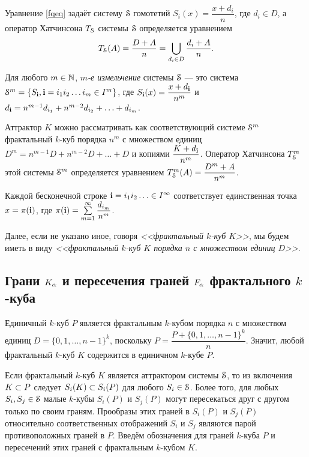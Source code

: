 Уравнение \eqref{fqeq} задаёт систему ${\EuScript S}$ гомотетий $S_i(x)=\dfrac{x+d_i}{n}$, где $d_i\in D$, а оператор Хатчинсона $T_{\EuScript S}$ системы ${\EuScript S}$ определяется уравнением $$T_{\EuScript S}(A)=\dfrac{D+A}{n}=\bigcup\limits_{d_i\in D}\dfrac{d_i+A}{n}.$$

\begin{definition}\label{refin}
Для любого $m\in \mathbb{N}$, {\em $m$-е измельчение} системы ${\EuScript S}$ --- это система ${\EuScript S}^m=\{S_{\bf{i}}, {\bf{i}}=i_1i_2\ldots i_m\in I^m\}$, где $S_{\bf{i}}(x)=\dfrac{x+d_{\bf{i}}}{n^m}$ и $d_{\bf{i}}=n^{m-1}d_{i_1}+n^{m-2}d_{i_2}+\ldots+d_{i_m}$. 
\end{definition}

Аттрактор $K$ можно рассматривать как соответствующий системе ${\EuScript S}^m$ фрактальный $k$-куб порядка $n^m$ с множеством единиц $D^m=n^{m-1}D+n^{m-2}D+\ldots+D$ и копиями $\dfrac{K+d_{\bf{i}}}{n^m}$.
Оператор Хатчинсона $T_{\EuScript S}^m$ этой системы ${\EuScript S}^m$ определяется уравнением $T_{\EuScript S}^m(A)=\dfrac{D^m+A}{n^m}$.

Каждой бесконечной строке ${\bf{i}}=i_1i_2\ldots\in I^\infty$ соответствует единственная точка $x=\pi({\bf{i}})$, где $\pi({\bf{i}})=\sum\limits_{m=1}^\infty \dfrac{d_{i_m}}{n^m}$.

\begin{remark}%
Далее, если не указано иное, говоря {\em <<фрактальный $k$-куб $K$>>}, мы будем иметь в виду {\em <<фрактальный $k$-куб $K$ порядка $n$ с множеством единиц $D$>>}. 
\end{remark}


\subsection{Грани $K_\alpha$ и пересечения граней $F_\alpha$ фрактального $k$-куба}

Единичный $k$-куб $P$ является фрактальным $k$-кубом порядка $n$ с множеством единиц $D=\{0,1,\ldots,n-1\}^k$, поскольку $P=\dfrac{P+\{0,1,\ldots,n-1\}^k}{n}.$
Значит, любой фрактальный $k$-куб $K$ содержится в единичном $k$-кубе $P$.

Если фрактальный $k$-куб $K$ является аттрактором системы ${\EuScript S}$, то из включения $K\subset P$ следует $S_i(K)\subset S_i(P)$ для любого $S_i\in{\EuScript S}$.
Более того, для любых $S_i, S_j\in{\EuScript S}$ малые $k$-кубы $S_i(P)$ и $S_j(P)$ могут пересекаться друг с другом только по своим граням.
Прообразы этих граней в $S_i(P)$ и $S_j(P)$ относительно соответственных отображений $S_i$ и $S_j$ являются парой противоположных граней в $P$.
Введём обозначения для граней $k$-куба $P$ и пересечений этих граней с фрактальным $k$-кубом $K$.

